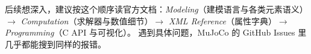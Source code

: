\begin{tipbox}[本指南到此结束]
	后续想深入，建议按这个顺序读官方文档：\textit{Modeling}（建模语言与各类元素语义）$\rightarrow$ \textit{Computation}（求解器与数值细节）$\rightarrow$ \textit{XML Reference}（属性字典）$\rightarrow$ \textit{Programming}（C API 与可视化）。
	遇到具体问题，MuJoCo 的 GitHub Issues 里几乎都能搜到同样的报错。
\end{tipbox}
